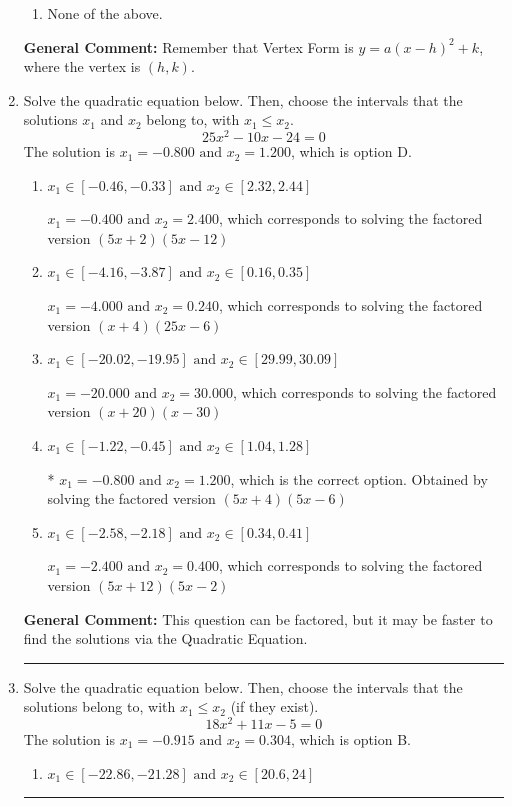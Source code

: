 \documentclass{extbook}[14pt]
\newcommand{\litem}[1]{\item #1

\rule{\textwidth}{0.4pt}}
\begin{document}
\begin{enumerate}
{\begin{enumerate}[label=\Alph*.]
\begin{multicols}{2}
\end{multicols}\item None of the above.\end{enumerate}
\textbf{General Comment:} Remember that Vertex Form is $y = a(x-h)^2+k$, where the vertex is $(h, k)$.
}
\litem{
Solve the quadratic equation below. Then, choose the intervals that the solutions $x_1$ and $x_2$ belong to, with $x_1 \leq x_2$.
\[ 25x^{2} -10 x -24 = 0 \]The solution is \( x_1 = -0.800 \text{ and } x_2 = 1.200 \), which is option D.\begin{enumerate}[label=\Alph*.]
\item \( x_1 \in [-0.46, -0.33] \text{ and } x_2 \in [2.32, 2.44] \)

$x_1 = -0.400 \text{ and } x_2 = 2.400$, which corresponds to solving the factored version $(5x + 2)(5x -12)$
\item \( x_1 \in [-4.16, -3.87] \text{ and } x_2 \in [0.16, 0.35] \)

$x_1 = -4.000 \text{ and } x_2 = 0.240$, which corresponds to solving the factored version $(x + 4)(25x -6)$
\item \( x_1 \in [-20.02, -19.95] \text{ and } x_2 \in [29.99, 30.09] \)

$x_1 = -20.000 \text{ and } x_2 = 30.000$, which corresponds to solving the factored version $(x + 20)(x -30)$
\item \( x_1 \in [-1.22, -0.45] \text{ and } x_2 \in [1.04, 1.28] \)

* $x_1 = -0.800 \text{ and } x_2 = 1.200$, which is the correct option. Obtained by solving the factored version $(5x + 4)(5x -6)$
\item \( x_1 \in [-2.58, -2.18] \text{ and } x_2 \in [0.34, 0.41] \)

$x_1 = -2.400 \text{ and } x_2 = 0.400$, which corresponds to solving the factored version $(5x + 12)(5x -2)$
\end{enumerate}

\textbf{General Comment:} This question can be factored, but it may be faster to find the solutions via the Quadratic Equation.
}
\litem{
Solve the quadratic equation below. Then, choose the intervals that the solutions belong to, with $x_1 \leq x_2$ (if they exist).
\[ 18x^{2} +11 x -5 = 0 \]The solution is \( x_1 = -0.915 \text{ and } x_2 = 0.304 \), which is option B.\begin{enumerate}[label=\Alph*.]
\item \( x_1 \in [-22.86, -21.28] \text{ and } x_2 \in [20.6, 24] \)


\end{enumerate}}
\end{enumerate}
\end{document}
